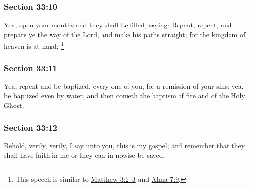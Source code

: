 	\subsubsection{Section 33:10} %
		\label{DC33-10}

		Yea, open your mouths and they shall be filled, saying: Repent, repent, and prepare ye the way of the Lord, and make his paths straight; for the kingdom of heaven is at hand;%
			\footnote{%
				This speech is similar to \hyperref[MATTHEW-3-2]{Matthew 3:2--3} and \hyperref[ALMA-7-9]{Alma 7:9}.
				}


	\subsubsection{Section 33:11} %
		\label{DC33-11}

		Yea, repent and be baptized, every one of you, for a remission of your sins; yea, be baptized even by water, and then cometh the baptism of fire and of the Holy Ghost.


	\subsubsection{Section 33:12} %
		\label{DC33-12}

		Behold, verily, verily, I say unto you, this is my gospel; and remember that they shall have faith in me or they can in nowise be saved;


